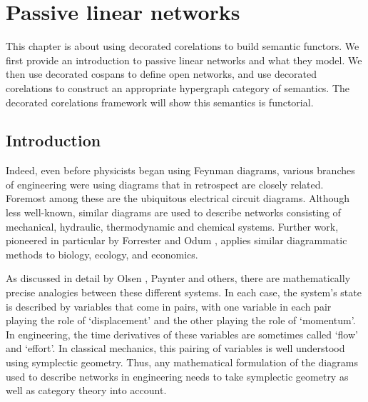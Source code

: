\chapter{Passive linear networks} \label{ch.circuits}
This chapter is about using decorated corelations to build semantic functors. We
first provide an introduction to passive linear networks and what they model. We
then use decorated cospans to define open networks, and use decorated
corelations to construct an appropriate hypergraph category of semantics. The
decorated corelations framework will show this semantics is functorial.

\section{Introduction}\label{sec:intro}
Indeed, even before physicists began using Feynman diagrams, various branches of engineering were using diagrams that in retrospect are closely related.   Foremost among these are the ubiquitous electrical circuit diagrams. Although less well-known, similar diagrams are used to describe networks consisting of mechanical, hydraulic, thermodynamic and chemical systems.   Further work, pioneered in particular by 
Forrester \cite{Fo} and Odum \cite{Od}, applies similar diagrammatic methods to biology, ecology, and economics.

As discussed in detail by Olsen \cite{Ol}, Paynter \cite{Pa} and others, there are mathematically precise analogies between these different systems.  In each case, the system's state is described by variables that come in pairs, with one variable in each pair playing the role of  `displacement' and the other playing the role of `momentum'.  In engineering, the time derivatives of these variables are sometimes called `flow' and `effort'.    In classical mechanics, this pairing of variables is well understood using
symplectic geometry.  Thus, any mathematical formulation of the diagrams used to
describe networks in engineering needs to take symplectic geometry as well as category
theory into account. 

